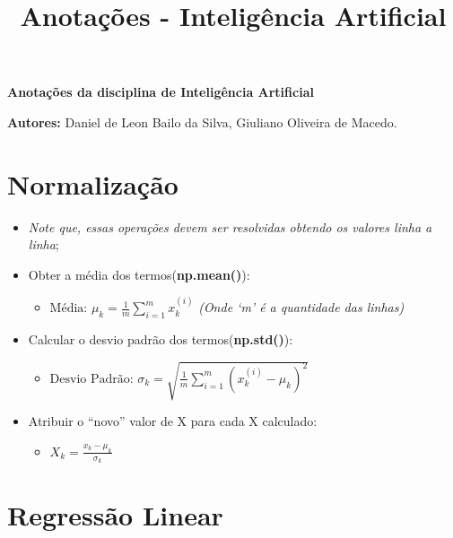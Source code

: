 \documentclass[12pt]{article}
\title{Anotações - Inteligência Artificial}
\providecommand{\tightlist}{%
\setlength{\itemsep}{0pt}\setlength{\parskip}{0pt}}
\begin{document}
    \hypertarget{anotauxe7uxf5es-da-disciplina-de-inteliguxeancia-artificial}{%
{\texorpdfstring{\Large{\textbf{Anotações da disciplina de Inteligência
Artificial}}}{Anotações da disciplina de Inteligência Artificial}}\label{anotauxe7uxf5es-da-disciplina-de-inteliguxeancia-artificial}}
\vspace{5pt}

\textbf{Autores: }Daniel de Leon Bailo da Silva,
Giuliano Oliveira de Macedo.

    \hypertarget{normalizauxe7uxe3o}{%
\section{\texorpdfstring{\textbf{Normalização}}{Normalização}}\label{normalizauxe7uxe3o}}

\begin{itemize}
\tightlist
\item
  \emph{Note que, essas operações devem ser resolvidas obtendo os
  valores linha a linha};
\item
  Obter a média dos termos(\textbf{np.mean()}):

  \begin{itemize}
  \tightlist
  \item
    \(\text{Média: }\mu_k=\frac{1}{m}\sum\limits_{i=1}^{m}x_k^{(i)}\)
    \emph{(Onde `m' é a quantidade das linhas)}
  \end{itemize}
\item
  Calcular o desvio padrão dos termos(\textbf{np.std()}):

  \begin{itemize}
  \tightlist
  \item
    \(\text{Desvio Padrão: }\sigma_k=\sqrt{\frac{1}{m}\sum\limits_{i=1}^{m}(x_k^{(i)}-\mu_k)^2}\)
  \end{itemize}
\item
  Atribuir o ``novo'' valor de X para cada X calculado:

  \begin{itemize}
  \tightlist
  \item
    \(X_k=\frac{x_k-\mu_k}{\sigma_k}\)
  \end{itemize}
\end{itemize}

    \hypertarget{regressuxe3o-linear}{%
\section{\texorpdfstring{\textbf{Regressão
Linear}}{Regressão Linear}}\label{regressuxe3o-linear}}
\end{document}
